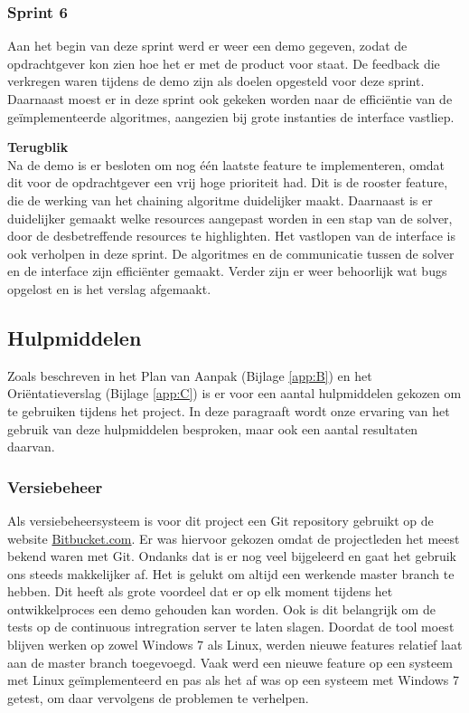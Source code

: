 \subsubsection{Sprint 6}
Aan het begin van deze sprint werd er weer een demo gegeven, zodat de opdrachtgever kon zien hoe het er met de product voor staat. De feedback die verkregen waren tijdens de demo zijn als doelen opgesteld voor deze sprint. Daarnaast moest er in deze sprint ook gekeken worden naar de effici\"entie van de ge\"implementeerde algoritmes, aangezien bij grote instanties de interface vastliep.

\textbf{Terugblik} \\
Na de demo is er besloten om nog \'e\'en laatste feature te implementeren, omdat dit voor de opdrachtgever een vrij hoge prioriteit had. Dit is de rooster feature, die de werking van het chaining algoritme duidelijker maakt. Daarnaast is er duidelijker gemaakt welke resources aangepast worden in een stap van de solver, door de desbetreffende resources te highlighten. Het vastlopen van de interface is ook verholpen in deze sprint. De algoritmes en de communicatie tussen de solver en de interface zijn effici\"enter gemaakt. Verder zijn er weer behoorlijk wat bugs opgelost en is het verslag afgemaakt. 

\subsection{Hulpmiddelen}
Zoals beschreven in het Plan van Aanpak (Bijlage \ref{app:B}) en het Ori\"entatieverslag (Bijlage \ref{app:C}) is er voor een aantal hulpmiddelen gekozen om te gebruiken tijdens het project. In deze paragraaft wordt onze ervaring van het gebruik van deze hulpmiddelen besproken, maar ook een aantal resultaten daarvan. 

\subsubsection{Versiebeheer}
\label{subsec:versiebeheer}
Als versiebeheersysteem is voor dit project een Git repository gebruikt op de website \href{http://bitbucket.com}{Bitbucket.com}. Er was hiervoor gekozen omdat de projectleden het meest bekend waren met Git. Ondanks dat is er nog veel bijgeleerd en gaat het gebruik ons steeds makkelijker af. Het is gelukt om altijd een werkende master branch te hebben. Dit heeft als grote voordeel dat er op elk moment tijdens het ontwikkelproces een demo gehouden kan worden. Ook is dit belangrijk om de tests op de continuous intregration server te laten slagen. Doordat de tool moest blijven werken op zowel Windows 7 als Linux, werden nieuwe features relatief laat aan de master branch toegevoegd. Vaak werd een nieuwe feature op een systeem met Linux ge\"implementeerd en pas als het af was op een systeem met Windows 7 getest, om daar vervolgens de problemen te verhelpen.

